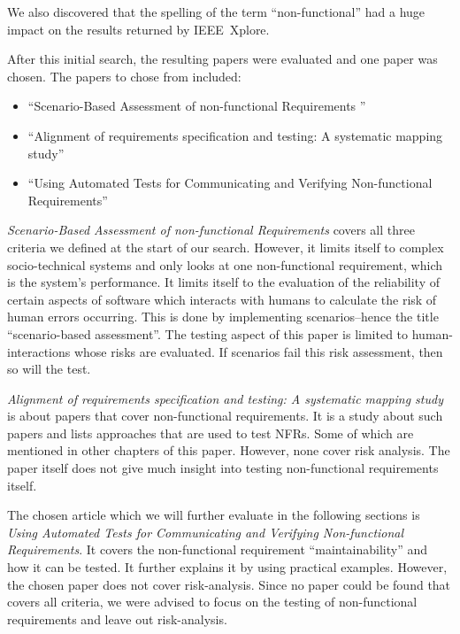 We also discovered that the spelling of the term \enquote{non-functional} had a huge impact on the results returned by IEEE~Xplore.

After this initial search, the resulting papers were evaluated and one paper was chosen. The papers to chose from included:

\begin{itemize}
	\item \enquote{Scenario-Based Assessment of non-functional Requirements } \cite{Andre_Search_1}
	\item \enquote{Alignment of requirements specification and testing: A systematic mapping study} \cite{Andre_Search_2}
	\item \enquote{Using Automated Tests for Communicating and Verifying Non-functional Requirements} \cite{Lagerstedt2014}
\end{itemize}


\textit{Scenario-Based Assessment of non-functional Requirements} covers all three criteria we defined at the start of our search. However, it limits itself to complex socio-technical systems and only looks at one non-functional requirement, which is the system's performance.  It limits itself to the evaluation of the reliability of certain aspects of software which interacts with humans to calculate the risk of human errors occurring.
This is done by implementing scenarios--hence the title \enquote{scenario-based assessment}. The testing aspect of this paper is limited to human-interactions whose risks are evaluated. If scenarios fail this risk assessment, then so will the test.

\textit{Alignment of requirements specification and testing: A systematic mapping study} is about papers that cover non-functional requirements. It is a study about such papers and lists approaches that are used to test NFRs. Some of which are mentioned in other chapters of this paper. However, none cover risk analysis. The paper itself does not give much insight into testing non-functional requirements itself.

The chosen article which we will further evaluate in the following sections is \textit{Using Automated Tests for Communicating and Verifying Non-functional Requirements}. It covers the non-functional requirement \enquote{maintainability} and how it can be tested. It further explains it by using practical examples.
However, the chosen paper does not cover risk-analysis. Since no paper could be found that covers all criteria, we were advised to focus on the testing of non-functional requirements and leave out risk-analysis.


